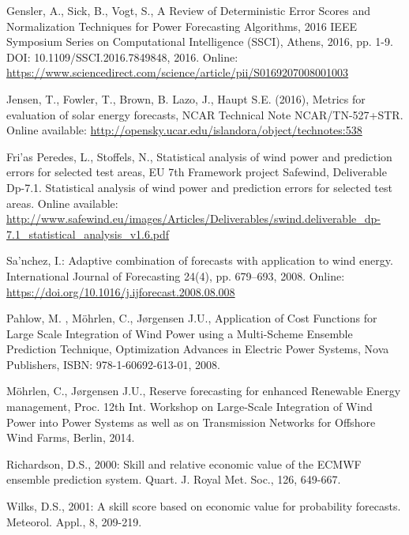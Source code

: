 \begin{thebibliography}{27}
Gensler, A., Sick, B., Vogt, S., A Review of Deterministic Error Scores and Normalization Techniques for Power Forecasting Algorithms, 2016 IEEE Symposium Series on Computational Intelligence (SSCI), Athens, 2016, pp. 1-9. DOI: 10.1109/SSCI.2016.7849848, 2016. Online: \url{https://www.sciencedirect.com/science/article/pii/S0169207008001003}

Jensen, T., Fowler, T., Brown, B. Lazo, J., Haupt S.E. (2016), Metrics for evaluation of solar energy forecasts, NCAR Technical Note NCAR/TN-527+STR. Online available: \url{http://opensky.ucar.edu/islandora/object/technotes:538}

Fri\a'as Peredes, L., Stoffels, N., Statistical analysis of wind power and prediction errors for selected test areas, EU 7th Framework project Safewind, Deliverable Dp-7.1. Statistical analysis of wind power and prediction errors for selected test areas. Online available: \url{http://www.safewind.eu/images/Articles/Deliverables/swind.deliverable_dp-7.1_statistical_analysis_v1.6.pdf}

Sa\a'nchez, I.: Adaptive combination of forecasts with application to wind energy. International Journal of Forecasting 24(4), pp. 679–693, 2008. Online: \url{https://doi.org/10.1016/j.ijforecast.2008.08.008}

Pahlow, M. , M{\"o}hrlen, C., J{\o}rgensen J.U., Application of Cost Functions for Large Scale Integration of Wind Power using a Multi-Scheme Ensemble Prediction Technique, Optimization Advances in Electric Power Systems, Nova Publishers, ISBN: 978-1-60692-613-01, 2008. 

M{\"o}hrlen, C., J{\o}rgensen J.U., Reserve forecasting for enhanced Renewable Energy management, Proc. 12th Int. Workshop on Large-Scale Integration of Wind Power into Power Systems as well as on Transmission Networks for Offshore Wind Farms, Berlin, 2014.

Richardson, D.S., 2000: Skill and relative economic value of the ECMWF ensemble prediction system. Quart. J. Royal Met. Soc., 126, 649-667.

Wilks, D.S., 2001: A skill score based on economic value for probability forecasts. Meteorol. Appl., 8, 209-219.

\end{thebibliography}